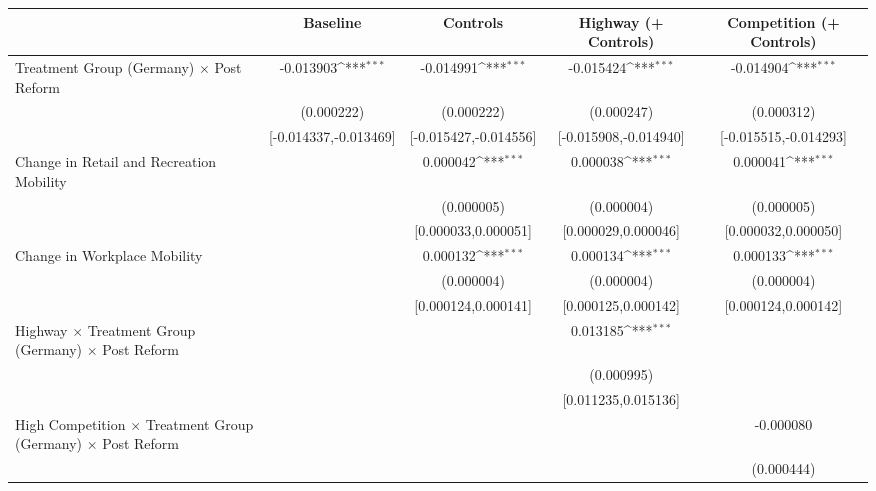 {
\def\sym#1{\ifmmode^{#1}\else\(^{#1}\)\fi}
\begin{tabular}{l*{4}{c}}
\toprule
                    &\multicolumn{1}{c}{Baseline}&\multicolumn{1}{c}{Controls}&\multicolumn{1}{c}{Highway (+ Controls)}&\multicolumn{1}{c}{Competition (+ Controls)}\\
\midrule
Treatment Group (Germany) $\times$ Post Reform&   -0.013903\sym{***}&   -0.014991\sym{***}&   -0.015424\sym{***}&   -0.014904\sym{***}\\
                    &  (0.000222)         &  (0.000222)         &  (0.000247)         &  (0.000312)         \\
                    &[-0.014337,-0.013469]         &[-0.015427,-0.014556]         &[-0.015908,-0.014940]         &[-0.015515,-0.014293]         \\
Change in Retail and Recreation Mobility&                     &    0.000042\sym{***}&    0.000038\sym{***}&    0.000041\sym{***}\\
                    &                     &  (0.000005)         &  (0.000004)         &  (0.000005)         \\
                    &                     &[0.000033,0.000051]         &[0.000029,0.000046]         &[0.000032,0.000050]         \\
Change in Workplace Mobility&                     &    0.000132\sym{***}&    0.000134\sym{***}&    0.000133\sym{***}\\
                    &                     &  (0.000004)         &  (0.000004)         &  (0.000004)         \\
                    &                     &[0.000124,0.000141]         &[0.000125,0.000142]         &[0.000124,0.000142]         \\
Highway $\times$ Treatment Group (Germany) $\times$ Post Reform&                     &                     &    0.013185\sym{***}&                     \\
                    &                     &                     &  (0.000995)         &                     \\
                    &                     &                     &[0.011235,0.015136]         &                     \\
High Competition $\times$ Treatment Group (Germany) $\times$ Post Reform&                     &                     &                     &   -0.000080         \\
                    &                     &                     &                     &  (0.000444)         \\

\end{tabular}}
